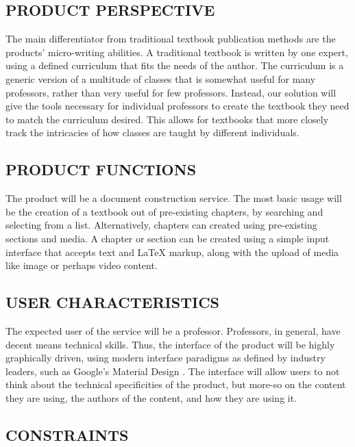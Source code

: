\documentclass[letterpaper, 10pt, draftclsnofoot, compsoc, onecolumn]{IEEEtran}
\begin{document}
\subsection[PRODUCT PERSPECTIVE]{\rmfamily\bfseries\color{black} PRODUCT PERSPECTIVE}

{\noindent
The main differentiator from traditional textbook publication methods are the products'
micro-writing abilities. A traditional textbook is written by one expert, using a defined
curriculum that fits the needs of the author. The curriculum is a generic version of a
multitude of classes that is somewhat useful for many professors, rather than very useful
for few professors. Instead, our solution will give the tools necessary for individual 
professors to create the textbook they need to match the curriculum desired. This allows 
for textbooks that more closely track the intricacies of how classes are taught by 
different individuals.}

\subsection[PRODUCT FUNCTIONS]{\rmfamily\bfseries\color{black} PRODUCT FUNCTIONS}

{\noindent 
The product will be a document construction service. The most basic usage will be the 
creation of a textbook out of pre-existing chapters, by searching and selecting from a 
list. Alternatively, chapters can created using pre-existing sections and media.
A chapter or section can be created using a simple input interface that
accepts text and LaTeX markup, along with the upload of media like image or
perhaps video content.}

\subsection[USER CHARACTERISTICS]{\rmfamily\bfseries\color{black} USER CHARACTERISTICS}

{\noindent 
The expected user of the service will be a professor. Professors, in general, have
decent means technical skills. Thus, the interface of the product
will be highly graphically driven, using modern interface paradigms as defined
by industry leaders, such as Google's Material Design \cite{GoogleMaterial}. 
The interface will allow users to not think about the technical specificities of the product, 
but more-so on the content they are using, the authors of the content, and how they are using it.}

\subsection[CONSTRAINTS]{\rmfamily\bfseries\color{black} CONSTRAINTS}
\end{document}
